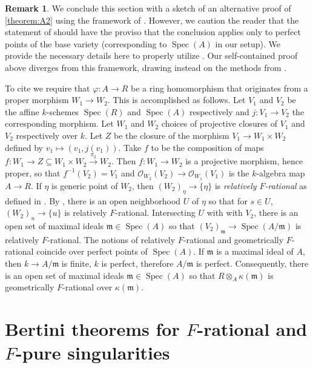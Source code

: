 \documentclass[reqno,11pt]{amsart}
\numberwithin{equation}{section}
\theoremstyle{definition}
\theoremstyle{definition}
\theoremstyle{definition}
\newtheorem{remark}[theorem]{Remark}
\theoremstyle{remark}
\newcommand{\Spec}{\operatorname{Spec}}
\newcommand{\fm}{\mathfrak{m}}
\begin{document}
\begin{remark}\label{remark: proof of A2 theorem using PSZ}
    We conclude this section with a sketch of an alternative proof of \cref{theorem:A2} using the framework of \cite{PSZ18}. However, we caution the reader that the statement of \cite[Theorem~5.13]{PSZ18} should have the proviso that the conclusion applies only to perfect points of the base variety (corresponding to $\Spec(A)$ in our setup). We provide the necessary details here to properly utilize \cite{PSZ18}. Our self-contained proof above diverges from this framework, drawing instead on the methods from \cite{HH00}.
    
    To cite \cite[Theorem~5.13]{PSZ18} we require that $\varphi\colon A\to R$ be a ring homomorphism that originates from a proper morphism $W_1\to W_2$. This is accomplished as follows. Let $V_1$ and $V_2$ be the affine $k$-schemes $\Spec(R)$ and $\Spec(A)$ respectively and $j\colon V_1\to V_2$ the corresponding morphism. Let $W_1$ and $W_2$ choices of projective closures of $V_1$ and $V_2$ respectively over $k$. Let $Z$ be the closure of the morphism $V_1\to W_1\times W_2$ defined by $v_1\mapsto (v_1, j(v_1))$. Take $f$ to be the composition of maps $f\colon W_1\to Z\subseteq W_1\times W_2\xrightarrow{\pi_2}W_2$. Then $f\colon W_1\to W_2$ is a projective morphism, hence proper, so that $f^{-1}(V_2) = V_1$ and $\mathcal{O}_{W_2}(V_2)\to \mathcal{O}_{W_1}(V_1)$ is the $k$-algebra map $A\to R$. If $\eta$ is generic point of $W_2$, then $(W_2)_{\eta}\to \{\eta\}$ is \emph{relatively $F$-rational} as defined in \cite[Definition~5.10]{PSZ18}. By \cite[Theorem~5.13]{PSZ18}, there is an open neighborhood $U$ of $\eta$ so that for $s\in U$, $(W_2)_u\to \{u\}$ is relatively $F$-rational. Intersecting $U$ with with $V_2$, there is an open set of maximal ideals $\fm\in \Spec(A)$ so that $(V_2)_{\fm}\to \Spec(A/\fm)$ is relatively $F$-rational. The notions of relatively $F$-rational and geometrically $F$-rational coincide over perfect points of $\Spec(A)$. If $\fm$ is a maximal ideal of $A$, then $k\to A/\fm$ is finite, $k$ is perfect, therefore $A/\fm$ is perfect. Consequently, there is an open set of maximal ideals $\fm\in\Spec(A)$ so that $R\otimes_A \kappa(\fm)$ is geometrically $F$-rational over $\kappa(\fm)$.
\end{remark}



\section{Bertini theorems for \texorpdfstring{$F$}{F}-rational and \texorpdfstring{$F$}{F}-pure singularities} \label{sec:Bertini}
\end{document}
